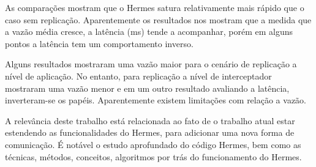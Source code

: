 As comparações mostram que o Hermes satura relativamente mais rápido que o caso sem replicação. Aparentemente os resultados nos mostram que a medida que a vazão média cresce, a latência (ms) tende a acompanhar, porém em alguns pontos a latência tem um comportamento inverso.

Alguns resultados mostraram uma vazão maior para o cenário de replicação a nível de aplicação. No entanto, para replicação a nível de interceptador mostraram uma vazão menor e em um outro resultado avaliando a latência, inverteram-se os papéis. Aparentemente existem limitações com relação a vazão.


A relevância deste trabalho está relacionada ao fato de o trabalho atual estar estendendo as funcionalidades do Hermes, para adicionar uma nova forma de comunicação. É notável o estudo aprofundado do código Hermes, bem como as técnicas, métodos, conceitos, algoritmos por trás do funcionamento do Hermes.




